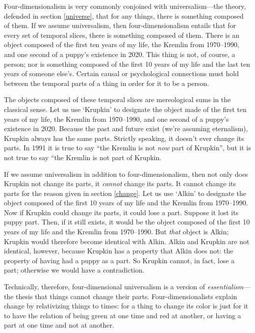 \documentclass[11pt]{article}
\begin{document}
\begin{spacing}{1.5}
Four-dimensionalism is very commonly conjoined with universalism---the
theory, defended in section \ref{universe}, that for any things, there
is something composed of them.  If we assume universalism, then
four-dimensionalism entails that for every set of temporal slices,
there is something composed of them.  There is an object composed of
the first ten years of my life, the Kremlin from 1970--1990, and one
second of a puppy's existence in 2020.  This thing is not, of course,
a person; nor is something composed of the first 10 years of my life
and the last ten years of someone else's.  Certain causal or
psychological connections must hold between the temporal parts of a
thing in order for it to be a person.

The objects composed of these temporal slices are mereological sums in
the classical sense.  Let us use `Krupkin' to designate the object
made of the first ten years of my life, the Kremlin from 1970--1990,
and one second of a puppy's existence in 2020.  Because the past and
future exist (we're assuming eternalism), Krupkin always has the same
parts.  Strictly speaking, it doesn't ever change its parts.  In 1991
it is true to say ``the Kremlin is not {\em now} part of Krupkin'',
but it is not true to say ``the Kremlin is not part of Krupkin.

If we assume universalism in addition to four-dimensionalism, then not
only does Krupkin not change its parts, it {\em cannot} change its
parts.  It cannot change its parts for the reason given in section
\ref{change}.  Let us use `Alkin' to designate the object composed of
the first 10 years of my life and the Kremlin from 1970--1990.  Now if
Krupkin could change its parts, it could lose a part.  Suppose it lost
its puppy part.  Then, if it still exists, it would be the object
composed of the first 10 years of my life and the Kremlin from
1970--1990.  But {\em that} object is Alkin; Krupkin would therefore
become identical with Alkin.  Alkin and Krupkin are not identical,
however, because Krupkin has a property that Alkin does not: the
property of having had a puppy as a part.  So Krupkin cannot, in fact,
lose a part; otherwise we would have a contradiction.

Technically, therefore, four-dimensional universalism is a version of
{\em essentialism}---the thesis that things cannot change their parts.
Four-dimensionalists explain change by relativizing things to times:
for a thing to change its color is just for it to have the relation of
being green at one time and red at another, or having a part at one
time and not at another.


\end{spacing}
\end{document}
